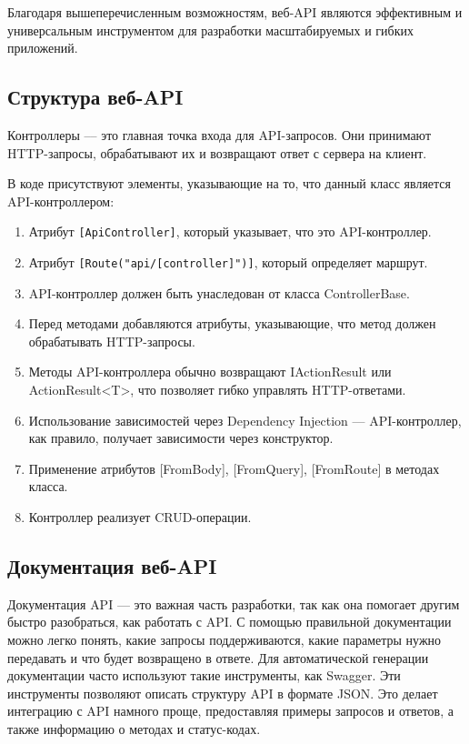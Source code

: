 \documentclass[a4paper,12pt]{report}
\begin{document}
Благодаря вышеперечисленным возможностям, веб-\ac{API} являются эффективным и 
универсальным инструментом для разработки масштабируемых и гибких приложений.


\subsection{Структура веб-\ac{API}}

Контроллеры –-- это главная точка входа для \ac{API}-запросов. Они принимают \ac{HTTP}-запросы, обрабатывают их и возвращают ответ с сервера на клиент.

В коде присутствуют элементы, указывающие на то, что данный класс является \ac{API}-контроллером:
\begin{enumerate}
  \item
      Атрибут \texttt{[ApiController]}, который указывает, что это \ac{API}-контроллер.
  \item
      Атрибут \texttt{[Route("api/[controller]")]}, который определяет маршрут.
  \item
      \ac{API}-контроллер должен быть унаследован от класса ControllerBase.
  \item
      Перед методами добавляются атрибуты, указывающие, что метод должен обрабатывать \ac{HTTP}-запросы.
  \item
      Методы \ac{API}-контроллера обычно возвращают IActionResult или ActionResult<T>, что позволяет гибко управлять \ac{HTTP}-ответами.
  \item
      Использование зависимостей через Dependency Injection --- \ac{API}-контроллер, как правило, получает зависимости через конструктор.
  \item
      Применение атрибутов [FromBody], [FromQuery], [FromRoute] в методах класса.
  \item
      Контроллер реализует \ac{CRUD}-операции.
\end{enumerate}

\subsection{Документация веб-\ac{API}}

Документация \ac{API} --- это важная часть разработки, так как она помогает другим 
быстро разобраться, как работать с \ac{API}. С помощью правильной документации можно легко понять, какие запросы поддерживаются, 
какие параметры нужно передавать и что будет возвращено в ответе. 
Для автоматической генерации документации часто используют такие инструменты, как Swagger. 
Эти инструменты позволяют описать структуру \ac{API} в формате \ac{JSON}. Это делает интеграцию с \ac{API} 
намного проще, предоставляя примеры запросов и ответов, а также информацию о методах и статус-кодах.
\end{document}
